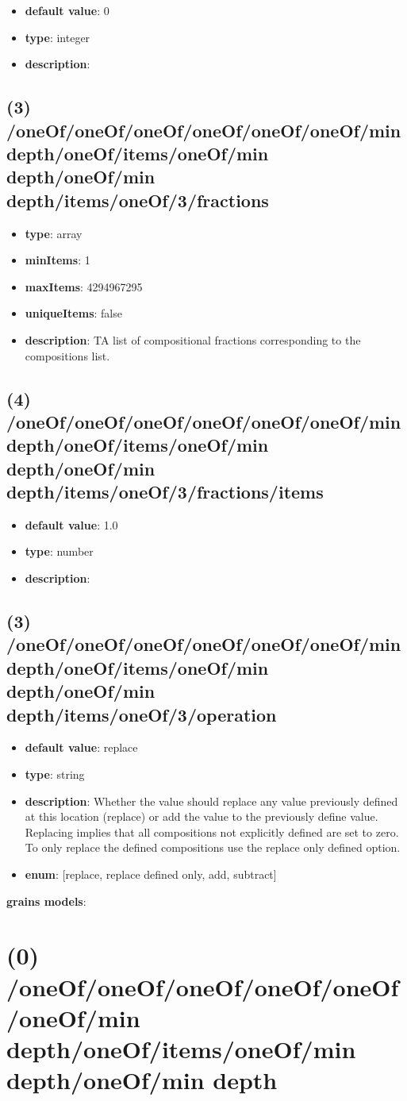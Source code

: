 \begin{itemize}[leftmargin=4em]\item {\bf default value}: 0
\item {\bf type}: integer
\item {\bf description}: 
\end{itemize}\subsection{(3) /oneOf/oneOf/oneOf/oneOf/oneOf/oneOf/min depth/oneOf/items/oneOf/min depth/oneOf/min depth/items/oneOf/3/fractions}
\begin{itemize}[leftmargin=3em]\item {\bf type}: array
\item {\bf minItems}: 1
\item {\bf maxItems}: 4294967295
\item {\bf uniqueItems}: false
\item {\bf description}: TA list of compositional fractions corresponding to the compositions list.
\end{itemize}\subsection{(4) /oneOf/oneOf/oneOf/oneOf/oneOf/oneOf/min depth/oneOf/items/oneOf/min depth/oneOf/min depth/items/oneOf/3/fractions/items}
\begin{itemize}[leftmargin=4em]\item {\bf default value}: 1.0
\item {\bf type}: number
\item {\bf description}: 
\end{itemize}\subsection{(3) /oneOf/oneOf/oneOf/oneOf/oneOf/oneOf/min depth/oneOf/items/oneOf/min depth/oneOf/min depth/items/oneOf/3/operation}
\begin{itemize}[leftmargin=3em]\item {\bf default value}: replace
\item {\bf type}: string
\item {\bf description}: Whether the value should replace any value previously defined at this location (replace) or add the value to the previously define value. Replacing implies that all compositions not explicitly defined are set to zero. To only replace the defined compositions use the replace only defined option.
\item {\bf enum}: [replace, replace defined only, add, subtract]\end{itemize}\item {\bf grains models}: \section{(0) /oneOf/oneOf/oneOf/oneOf/oneOf/oneOf/min depth/oneOf/items/oneOf/min depth/oneOf/min depth}
